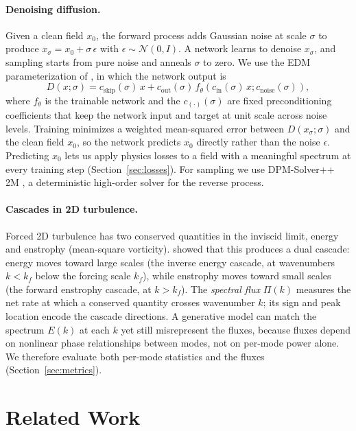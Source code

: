 \documentclass[10pt]{article} %
\begin{document}
\paragraph{Denoising diffusion.} Given a clean field $x_0$, the forward process adds Gaussian noise at scale $\sigma$ to produce $x_\sigma = x_0 + \sigma\,\epsilon$ with $\epsilon \sim \mathcal{N}(0, I)$. A network learns to denoise $x_\sigma$, and sampling starts from pure noise and anneals $\sigma$ to zero. We use the EDM parameterization of \citet{karras2022edm}, in which the network output is
\begin{equation}
D(x; \sigma) = c_{\text{skip}}(\sigma)\,x + c_{\text{out}}(\sigma)\,f_\theta\!\left(c_{\text{in}}(\sigma)\,x; c_{\text{noise}}(\sigma)\right),
\label{eq:edm}
\end{equation}
where $f_\theta$ is the trainable network and the $c_{(\cdot)}(\sigma)$ are fixed preconditioning coefficients that keep the network input and target at unit scale across noise levels. Training minimizes a weighted mean-squared error between $D(x_\sigma;\sigma)$ and the clean field $x_0$, so the network predicts $x_0$ directly rather than the noise $\epsilon$. Predicting $x_0$ lets us apply physics losses to a field with a meaningful spectrum at every training step (Section~\ref{sec:losses}). For sampling we use DPM-Solver++ 2M \citep{lu2022dpmsolverpp}, a deterministic high-order solver for the reverse process.

\paragraph{Cascades in 2D turbulence.} Forced 2D turbulence has two conserved quantities in the inviscid limit, energy and enstrophy (mean-square vorticity). \citet{kraichnan1967inertial} showed that this produces a dual cascade: energy moves toward large scales (the inverse energy cascade, at wavenumbers $k < k_f$ below the forcing scale $k_f$), while enstrophy moves toward small scales (the forward enstrophy cascade, at $k > k_f$). The \emph{spectral flux} $\Pi(k)$ measures the net rate at which a conserved quantity crosses wavenumber $k$; its sign and peak location encode the cascade directions. A generative model can match the spectrum $E(k)$ at each $k$ yet still misrepresent the fluxes, because fluxes depend on nonlinear phase relationships between modes, not on per-mode power alone. We therefore evaluate both per-mode statistics and the fluxes (Section~\ref{sec:metrics}).

\section{Related Work}
\end{document}
